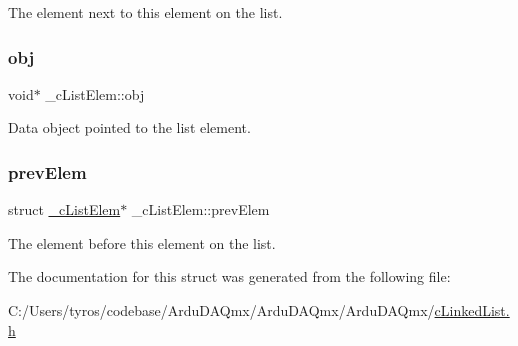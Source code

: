 The element next to this element on the list. \mbox{\label{struct__c_list_elem_a34335ca0c0d6f4569bed193029cd54b5}} 
\subsubsection{\texorpdfstring{obj}{obj}}
{\footnotesize\ttfamily void$\ast$ \+\_\+c\+List\+Elem\+::obj}

Data object pointed to the list element. \mbox{\label{struct__c_list_elem_a15b50cfddde4733d3f14c2db4be0a993}} 
\subsubsection{\texorpdfstring{prev\+Elem}{prevElem}}
{\footnotesize\ttfamily struct \mbox{\hyperlink{struct__c_list_elem}{\+\_\+c\+List\+Elem}}$\ast$ \+\_\+c\+List\+Elem\+::prev\+Elem}

The element before this element on the list. 

The documentation for this struct was generated from the following file\+:\begin{DoxyCompactItemize}
\item 
C\+:/\+Users/tyros/codebase/\+Ardu\+D\+A\+Qmx/\+Ardu\+D\+A\+Qmx/\+Ardu\+D\+A\+Qmx/\mbox{\hyperlink{c_linked_list_8h}{c\+Linked\+List.\+h}}\end{DoxyCompactItemize}
